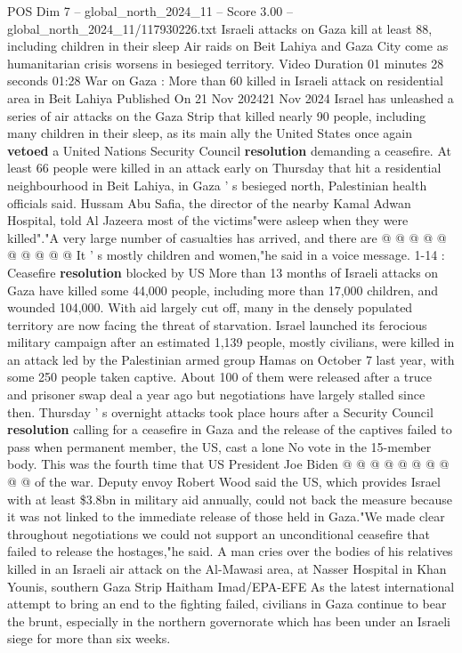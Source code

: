 \begin{textsample}{POS Dim 7 – global\_north\_2024\_11 – Score 3.00 – global\_north\_2024\_11/117930226.txt}  \label{ex:f7_pos_193}
Israeli attacks on Gaza kill at least 88, including children in their sleep Air raids on Beit Lahiya and Gaza City come as humanitarian crisis worsens in besieged territory.
Video Duration 01 minutes 28 seconds 01:28 War on Gaza : More than 60 killed in Israeli attack on residential area in Beit Lahiya Published On 21 Nov 202421 Nov 2024 Israel has unleashed a series of air attacks on the Gaza Strip that killed nearly 90 people, including many children in their sleep, as its main ally the United States once again \textbf{vetoed} a United Nations Security Council \textbf{resolution} demanding a ceasefire.
At least 66 people were killed in an attack early on Thursday that hit a residential neighbourhood in Beit Lahiya, in Gaza ' s besieged north, Palestinian health officials said.
Hussam Abu Safia, the director of the nearby Kamal Adwan Hospital, told Al Jazeera most of the victims"were asleep when they were killed"."A very large number of casualties has arrived, and there are @ @ @ @ @ @ @ @ @ @ It ' s mostly children and women,"he said in a voice message. 1-14 : Ceasefire \textbf{resolution} blocked by US More than 13 months of Israeli attacks on Gaza have killed some 44,000 people, including more than 17,000 children, and wounded 104,000.
With aid largely cut off, many in the densely populated territory are now facing the threat of starvation.
Israel launched its ferocious military campaign after an estimated 1,139 people, mostly civilians, were killed in an attack led by the Palestinian armed group Hamas on October 7 last year, with some 250 people taken captive.
About 100 of them were released after a truce and prisoner swap deal a year ago but negotiations have largely stalled since then.
Thursday ' s overnight attacks took place hours after a Security Council \textbf{resolution} calling for a ceasefire in Gaza and the release of the captives failed to pass when permanent member, the US, cast a lone No vote in the 15-member body.
This was the fourth time that US President Joe Biden @ @ @ @ @ @ @ @ @ @ of the war.
Deputy envoy Robert Wood said the US, which provides Israel with at least \$3.8bn in military aid annually, could not back the measure because it was not linked to the immediate release of those held in Gaza."We made clear throughout negotiations we could not support an unconditional ceasefire that failed to release the hostages,"he said.
A man cries over the bodies of his relatives killed in an Israeli air attack on the Al-Mawasi area, at Nasser Hospital in Khan Younis, southern Gaza Strip Haitham Imad/EPA-EFE As the latest international attempt to bring an end to the fighting failed, civilians in Gaza continue to bear the brunt, especially in the northern governorate which has been under an Israeli siege for more than six weeks.

\end{textsample}
